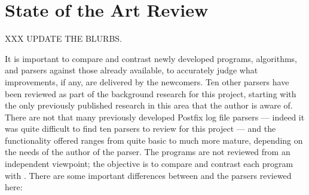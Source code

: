 \newpage{} %

\section{State of the Art Review}

\label{state of the art review}

XXX UPDATE THE BLURBS\@.

It is important to compare and contrast newly developed programs,
algorithms, and parsers against those already available, to accurately
judge what improvements, if any, are delivered by the newcomers.  Ten other
parsers have been reviewed as part of the background research for this
project, starting with the only previously published research in this area
that the author is aware of.  There are not that many previously developed
Postfix log file parsers --- indeed it was quite difficult to find ten
parsers to review for this project --- and the functionality offered ranges
from quite basic to much more mature, depending on the needs of the author
of the parser.  The programs are not reviewed from an independent
viewpoint; the objective is to compare and contrast each program with
\parsername{}.  There are some important differences between \parsername{}
and the parsers reviewed here:

